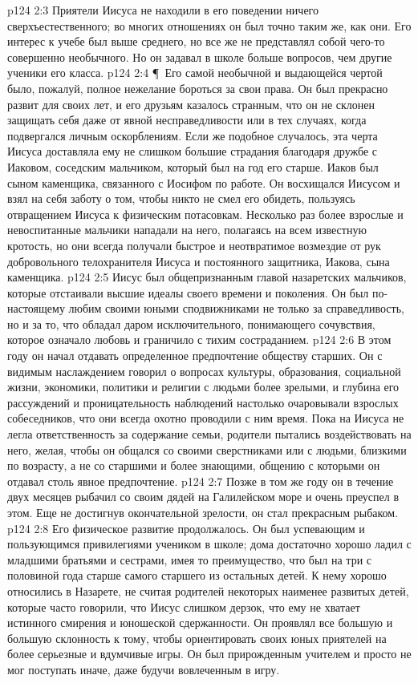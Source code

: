 \vs p124 2:3 Приятели Иисуса не находили в его поведении ничего сверхъестественного; во многих отношениях он был точно таким же, как они. Его интерес к учебе был выше среднего, но все же не представлял собой чего\hyp{}то совершенно необычного. Но он задавал в школе больше вопросов, чем другие ученики его класса.
\vs p124 2:4 \P\ Его самой необычной и выдающейся чертой было, пожалуй, полное нежелание бороться за свои права. Он был прекрасно развит для своих лет, и его друзьям казалось странным, что он не склонен защищать себя даже от явной несправедливости или в тех случаях, когда подвергался личным оскорблениям. Если же подобное случалось, эта черта Иисуса доставляла ему не слишком большие страдания благодаря дружбе с Иаковом, соседским мальчиком, который был на год его старше. Иаков был сыном каменщика, связанного с Иосифом по работе. Он восхищался Иисусом и взял на себя заботу о том, чтобы никто не смел его обидеть, пользуясь отвращением Иисуса к физическим потасовкам. Несколько раз более взрослые и невоспитанные мальчики нападали на него, полагаясь на всем известную кротость, но они всегда получали быстрое и неотвратимое возмездие от рук добровольного телохранителя Иисуса и постоянного защитника, Иакова, сына каменщика.
\vs p124 2:5 Иисус был общепризнанным главой назаретских мальчиков, которые отстаивали высшие идеалы своего времени и поколения. Он был по\hyp{}настоящему любим своими юными сподвижниками не только за справедливость, но и за то, что обладал даром исключительного, понимающего сочувствия, которое означало любовь и граничило с тихим состраданием.
\vs p124 2:6 В этом году он начал отдавать определенное предпочтение обществу старших. Он с видимым наслаждением говорил о вопросах культуры, образования, социальной жизни, экономики, политики и религии с людьми более зрелыми, и глубина его рассуждений и проницательность наблюдений настолько очаровывали взрослых собеседников, что они всегда охотно проводили с ним время. Пока на Иисуса не легла ответственность за содержание семьи, родители пытались воздействовать на него, желая, чтобы он общался со своими сверстниками или с людьми, близкими по возрасту, а не со старшими и более знающими, общению с которыми он отдавал столь явное предпочтение.
\vs p124 2:7 Позже в том же году он в течение двух месяцев рыбачил со своим дядей на Галилейском море и очень преуспел в этом. Еще не достигнув окончательной зрелости, он стал прекрасным рыбаком.
\vs p124 2:8 Его физическое развитие продолжалось. Он был успевающим и пользующимся привилегиями учеником в школе; дома достаточно хорошо ладил с младшими братьями и сестрами, имея то преимущество, что был на три с половиной года старше самого старшего из остальных детей. К нему хорошо относились в Назарете, не считая родителей некоторых наименее развитых детей, которые часто говорили, что Иисус слишком дерзок, что ему не хватает истинного смирения и юношеской сдержанности. Он проявлял все большую и большую склонность к тому, чтобы ориентировать своих юных приятелей на более серьезные и вдумчивые игры. Он был прирожденным учителем и просто не мог поступать иначе, даже будучи вовлеченным в игру.
